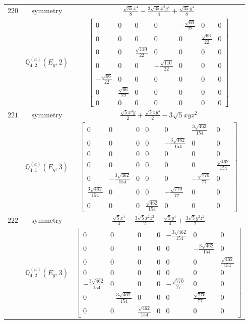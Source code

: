 \documentclass[fleqn,8pt,landscape]{jsarticle}
\begin{document}
\begin{longtable}{ccc}
$ 220 $ & $ \text{symmetry} $ & $ \frac{\sqrt{35} x^{4}}{8} - \frac{3 \sqrt{35} x^{2} y^{2}}{4} + \frac{\sqrt{35} y^{4}}{8} $ \\
$  $ & $ \mathbb{Q}_{4,2}^{(a)}(E_{g},2) $ & $ \begin{bmatrix} 0 & 0 & 0 & 0 & - \frac{\sqrt{66}}{22} & 0 & 0 \\ 0 & 0 & 0 & 0 & 0 & \frac{\sqrt{66}}{22} & 0 \\ 0 & 0 & \frac{\sqrt{110}}{22} & 0 & 0 & 0 & 0 \\ 0 & 0 & 0 & - \frac{\sqrt{110}}{22} & 0 & 0 & 0 \\ - \frac{\sqrt{66}}{22} & 0 & 0 & 0 & 0 & 0 & 0 \\ 0 & \frac{\sqrt{66}}{22} & 0 & 0 & 0 & 0 & 0 \\ 0 & 0 & 0 & 0 & 0 & 0 & 0 \end{bmatrix} $ \\ \hline
$ 221 $ & $ \text{symmetry} $ & $ \frac{\sqrt{5} x^{3} y}{2} + \frac{\sqrt{5} x y^{3}}{2} - 3 \sqrt{5} x y z^{2} $ \\
$  $ & $ \mathbb{Q}_{4,1}^{(a)}(E_{g},3) $ & $ \begin{bmatrix} 0 & 0 & 0 & 0 & 0 & \frac{3 \sqrt{462}}{154} & 0 \\ 0 & 0 & 0 & 0 & - \frac{3 \sqrt{462}}{154} & 0 & 0 \\ 0 & 0 & 0 & 0 & 0 & 0 & 0 \\ 0 & 0 & 0 & 0 & 0 & 0 & \frac{\sqrt{462}}{154} \\ 0 & - \frac{3 \sqrt{462}}{154} & 0 & 0 & 0 & - \frac{\sqrt{770}}{77} & 0 \\ \frac{3 \sqrt{462}}{154} & 0 & 0 & 0 & - \frac{\sqrt{770}}{77} & 0 & 0 \\ 0 & 0 & 0 & \frac{\sqrt{462}}{154} & 0 & 0 & 0 \end{bmatrix} $ \\ \hline
$ 222 $ & $ \text{symmetry} $ & $ \frac{\sqrt{5} x^{4}}{4} - \frac{3 \sqrt{5} x^{2} z^{2}}{2} - \frac{\sqrt{5} y^{4}}{4} + \frac{3 \sqrt{5} y^{2} z^{2}}{2} $ \\
$  $ & $ \mathbb{Q}_{4,2}^{(a)}(E_{g},3) $ & $ \begin{bmatrix} 0 & 0 & 0 & 0 & - \frac{3 \sqrt{462}}{154} & 0 & 0 \\ 0 & 0 & 0 & 0 & 0 & - \frac{3 \sqrt{462}}{154} & 0 \\ 0 & 0 & 0 & 0 & 0 & 0 & \frac{\sqrt{462}}{154} \\ 0 & 0 & 0 & 0 & 0 & 0 & 0 \\ - \frac{3 \sqrt{462}}{154} & 0 & 0 & 0 & - \frac{\sqrt{770}}{77} & 0 & 0 \\ 0 & - \frac{3 \sqrt{462}}{154} & 0 & 0 & 0 & \frac{\sqrt{770}}{77} & 0 \\ 0 & 0 & \frac{\sqrt{462}}{154} & 0 & 0 & 0 & 0 \end{bmatrix} $ \\ \hline

\end{longtable}
\end{document}
